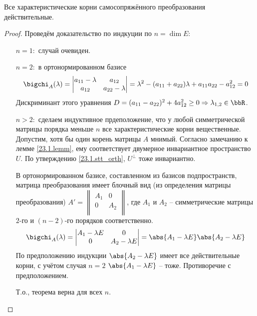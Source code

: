   \begin{thm}\label{23.1.thm1}
  Все характеристические корни самосопряжённого преобразования действительные.
  \end{thm}
  \begin{proof} Проведём доказательство по индкуции по $n=\dim E$:
  \linebreak\vspace*{-\baselineskip}
  \begin{itemize}
  \item[\underline{$n=1:$}] случай очевиден.
  \item[\underline{$n=2:$}] в ортонормированном базисе
    \begin{equation}
    \bigchi_A(\lambda)=\begin{vmatrix}
    a_{11}-\lambda & a_{12} \\
    a_{12} & a_{22}-\lambda
    \end{vmatrix}=\lambda^2-(a_{11}+a_{22})\lambda+a_{11}a_{22}-a_{12}^2=0 \end{equation}
    Дискриминант этого уравнения $D=(a_{11}-a_{22})^2+4a_{12}^2 \ge 0 \Rightarrow \lambda_{1,2} \in \bbR$.
  \item[\underline{$n>2:$}] сделаем индуктивное прдеположение, что у любой симметрической матрицы порядка меньше $n$ все характеристические корни вещественные. Допустим, хотя бы один корень матрицы $A$ мнимый. Согласно замечанию к лемме \ref{23.1.lemm}, ему соответствует двумерное инвариантное пространство $U$. По утверждению \ref{23.1.stt_orth}, $U^\perp$ тоже инвариантно.
  
  В ортонормированном базисе, составленном из базисов подпространств, матрица преобразования имеет блочный вид (из определения матрицы преобразования) $A'=\begin{Vmatrix}
  A_1 & 0 \\
  0 & A_2 \\
  \end{Vmatrix}$, где $A_1$ и $A_2$ -- симметрические матрицы $2$-го и $(n-2)$-го порядков соответственно.
    \begin{equation}
    \bigchi_A(\lambda)=\begin{vmatrix}
    A_1-\lambda E & 0 \\
    0 & A_2-\lambda E
    \end{vmatrix}=\abs{A_1-\lambda E}\abs{A_2-\lambda E} \end{equation}
    По предположению индукции  $\abs{A_2-\lambda E}$ имеет все действительные корни, с учётом случая \underline{$n=2$} $\abs{A_1-\lambda E}$ -- тоже. Противоречие с предположением. 
    
    Т.о., теорема верна для всех $n$.
  \end{itemize}
  \vspace{-1.65\baselineskip}  
  \end{proof}
  
